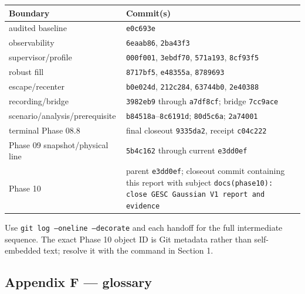 \documentclass[
  10pt,
  letterpaper,
]{article}
\newcounter{none} %
\begin{document}
{\def\LTcaptype{none} %
\begin{longtable}[]{@{}
  >{\raggedright\arraybackslash}p{}
  >{\raggedright\arraybackslash}p{}@{}}
\toprule\noalign{}
\begin{minipage}[b]{\linewidth}\raggedright
Boundary
\end{minipage} & \begin{minipage}[b]{\linewidth}\raggedright
Commit(s)
\end{minipage} \\
\midrule\noalign{}
\endhead
\bottomrule\noalign{}
\endlastfoot
audited baseline & \nolinkurl{e0c693e} \\
observability & \nolinkurl{6eaab86}, \nolinkurl{2ba43f3} \\
supervisor/profile & \nolinkurl{000f001}, \nolinkurl{3ebdf70}, \nolinkurl{571a193}, \nolinkurl{8cf93f5} \\
robust fill & \nolinkurl{8717bf5}, \nolinkurl{e48355a}, \nolinkurl{8789693} \\
escape/recenter & \nolinkurl{b0e024d}, \nolinkurl{212c284}, \nolinkurl{63744b0}, \nolinkurl{2e40388} \\
recording/bridge & \nolinkurl{3982eb9} through \nolinkurl{a7df8cf}; bridge \nolinkurl{7cc9ace} \\
scenario/analysis/prerequisite & \nolinkurl{b84518a}--\nolinkurl{8c6191d}; \nolinkurl{80d5c6a}; \nolinkurl{2a74001} \\
terminal Phase 08.8 & final closeout \nolinkurl{9335da2}, receipt \nolinkurl{c04c222} \\
Phase 09 snapshot/physical line & \nolinkurl{5b4c162} through current \nolinkurl{e3dd0ef} \\
Phase 10 & parent \nolinkurl{e3dd0ef}; closeout commit containing this report with subject \texttt{docs(phase10): close GESC Gaussian V1 report and evidence} \\
\end{longtable}
}

Use \texttt{git log --oneline --decorate} and each handoff for the full intermediate
sequence. The exact Phase 10 object ID is Git metadata rather than
self-embedded text; resolve it with the command in Section 1.

\subsection{Appendix F --- glossary}\label{appendix-f-glossary}
\end{document}
